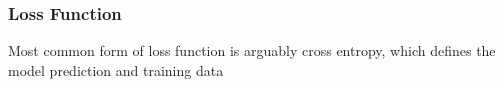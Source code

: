 \subsubsection{Loss Function}

Most common form of loss function is arguably cross entropy, which defines the model prediction and training data